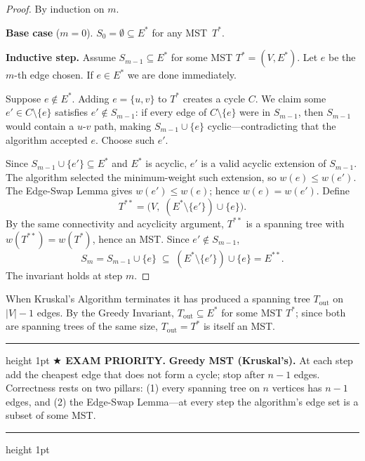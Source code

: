 \documentclass[11pt]{article}
\theoremstyle{definition}
\newenvironment{exambox}
  {\par\medskip\noindent\begin{center}\begin{minipage}{0.92\textwidth}%
   \hrule height 1pt \vspace{4pt}\noindent\textbf{$\bigstar$ EXAM PRIORITY.} }
  {\vspace{4pt}\hrule height 1pt \end{minipage}\end{center}\medskip}
\begin{document}
\begin{proof}
By induction on $m$.

\textbf{Base case} ($m = 0$). $S_0 = \emptyset \subseteq E^{*}$ for any MST~$T^{*}$.

\textbf{Inductive step.}
Assume $S_{m-1} \subseteq E^{*}$ for some MST $T^{*} = (V, E^{*})$.
Let $e$ be the $m$-th edge chosen. If $e \in E^{*}$ we are done immediately.

Suppose $e \notin E^{*}$. Adding $e = \{u, v\}$ to $T^{*}$ creates a cycle $C$.
We claim some $e' \in C \setminus \{e\}$ satisfies $e' \notin S_{m-1}$: if every
edge of $C \setminus \{e\}$ were in $S_{m-1}$, then $S_{m-1}$ would contain a
$u$-$v$ path, making $S_{m-1} \cup \{e\}$ cyclic---contradicting that the algorithm
accepted $e$. Choose such $e'$.

Since $S_{m-1} \cup \{e'\} \subseteq E^{*}$ and $E^{*}$ is acyclic, $e'$ is a valid
acyclic extension of $S_{m-1}$. The algorithm selected the minimum-weight such
extension, so $w(e) \leq w(e')$. The Edge-Swap Lemma gives $w(e') \leq w(e)$;
hence $w(e) = w(e')$. Define
\[
  T^{**} = \bigl(V,\; (E^{*} \setminus \{e'\}) \cup \{e\}\bigr).
\]
By the same connectivity and acyclicity argument, $T^{**}$ is a spanning tree with
$w(T^{**}) = w(T^{*})$, hence an MST. Since $e' \notin S_{m-1}$,
\[
  S_m = S_{m-1} \cup \{e\}
  \;\subseteq\;
  (E^{*} \setminus \{e'\}) \cup \{e\} = E^{**}.
\]
The invariant holds at step $m$.
\end{proof}

When Kruskal's Algorithm terminates it has produced a spanning tree
$T_{\mathrm{out}}$ on $|V| - 1$ edges. By the Greedy Invariant,
$T_{\mathrm{out}} \subseteq E^{*}$ for some MST $T^{*}$; since both are spanning
trees of the same size, $T_{\mathrm{out}} = T^{*}$ is itself an MST.

\begin{exambox}
\textbf{Greedy MST (Kruskal's).} At each step add the cheapest edge that does not
form a cycle; stop after $n - 1$ edges. Correctness rests on two pillars:
(1) every spanning tree on $n$ vertices has $n - 1$ edges, and (2) the Edge-Swap
Lemma---at every step the algorithm's edge set is a subset of some MST.
\end{exambox}
\end{document}
